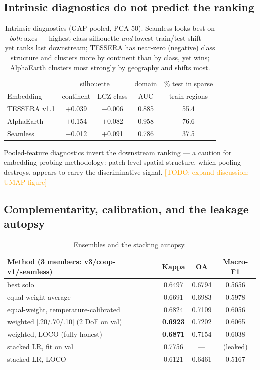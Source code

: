 \documentclass[11pt]{article}
\newcommand{\todo}[1]{\textcolor{orange}{[TODO: #1]}}
\begin{document}
\subsection{Intrinsic diagnostics do not predict the ranking}
\label{sec:results-diag}
\begin{table}[h]
\centering\small
\begin{tabular}{lcccc}
\toprule
& \multicolumn{2}{c}{silhouette} & domain & \% test in sparse\\
Embedding & continent & LCZ class & AUC & train regions\\
\midrule
TESSERA v1.1 & $+$0.039 & $-$0.006 & 0.885 & 55.4\\
AlphaEarth & $+$0.154 & $+$0.082 & 0.958 & 76.6\\
Seamless & $-$0.012 & $+$0.091 & 0.786 & 37.5\\
\bottomrule
\end{tabular}
\caption{Intrinsic diagnostics (GAP-pooled, PCA-50). Seamless looks
best on \emph{both} axes --- highest class silhouette \emph{and}
lowest train/test shift --- yet ranks last downstream; TESSERA has
near-zero (negative) class structure and clusters more by continent
than by class, yet wins; AlphaEarth clusters most strongly by
geography and shifts most.}
\label{tab:diag}
\end{table}

Pooled-feature diagnostics invert the downstream ranking ---
a caution for embedding-probing methodology: patch-level spatial
structure, which pooling destroys, appears to carry the
discriminative signal. \todo{expand discussion; UMAP figure}

\subsection{Complementarity, calibration, and the leakage autopsy}
\label{sec:results-ens}
\begin{table}[h]
\centering\small
\begin{tabular}{lccc}
\toprule
Method (3 members: v3/coop-v1/seamless) & Kappa & OA & Macro-F1\\
\midrule
best solo & 0.6497 & 0.6794 & 0.5656\\
equal-weight average & 0.6691 & 0.6983 & 0.5978\\
equal-weight, temperature-calibrated & 0.6824 & 0.7109 & 0.6056\\
weighted [.20/.70/.10] (2 DoF on val) & \textbf{0.6923} & 0.7202 & 0.6065\\
weighted, LOCO (fully honest) & \textbf{0.6871} & 0.7154 & 0.6038\\
stacked LR, fit on val & 0.7756 & --- & (leaked)\\
stacked LR, LOCO & 0.6121 & 0.6461 & 0.5167\\
\bottomrule
\end{tabular}
\caption{Ensembles and the stacking autopsy.}
\label{tab:ens}
\end{table}
\end{document}

